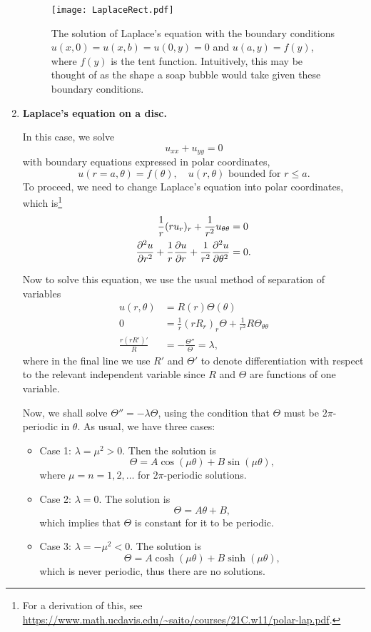 \begin{enumerate}
	\begin{figure}[!ht]
		\centering
		\texttt{[image: LaplaceRect.pdf]}
		\caption{The solution of Laplace's equation with the boundary conditions $u(x,0) = u(x,b) = u(0,y) = 0$ and $u(a,y) = f(y)$, where $f(y)$ is the tent function. Intuitively, this may be thought of as the shape a soap bubble would take given these boundary conditions.}
		\label{fig:laplacerect}
	\end{figure}
	
	\item \textbf{Laplace's equation on a disc.}
	
	In this case, we solve
	\[
		u_{xx} + u_{yy} = 0
	\]
	with boundary equations expressed in polar coordinates,
	\[
		u(r=a, \theta) = f(\theta), \quad u(r,\theta) \text{ bounded for } r \leq a.
	\]
	To proceed, we need to change Laplace's equation into polar coordinates, which is\footnote{For a derivation of this, see \url{https://www.math.ucdavis.edu/~saito/courses/21C.w11/polar-lap.pdf}.}
	\begin{align*}
		\frac{1}{r}(r u_r)_r + \frac{1}{r^2}u_{\theta\theta} &= 0 \\
		\frac{\partial^2u}{\partial r^2} + \frac{1}{r}\frac{\partial u}{\partial r} + \frac{1}{r^2}\frac{\partial^2u}{\partial\theta^2} &= 0.
	\end{align*}
	
	Now to solve this equation, we use the usual method of separation of variables
	\begin{align*}
		u(r, \theta) &= R(r)\Theta(\theta) \\
		0 &= \frac{1}{r}(r R_r)_r\Theta + \frac{1}{r^2}R \Theta_{\theta\theta} \\
		\frac{r(rR')'}{R} &= -\frac{\Theta''}{\Theta} = \lambda,
	\end{align*}
	where in the final line we use $R'$ and $\Theta'$ to denote differentiation with respect to the relevant independent variable since $R$ and $\Theta$ are functions of one variable.
	
	Now, we shall solve $\Theta'' = -\lambda\Theta$, using the condition that $\Theta$ must be $2\pi$-periodic in $\theta$. As usual, we have three cases:
	\begin{itemize}
		\item Case 1: $\lambda = \mu^2 > 0$. Then the solution is
		\[
		\Theta = A\cos(\mu\theta) + B\sin(\mu\theta),
		\]
		where $\mu = n = 1, 2, \dots$ for $2\pi$-periodic solutions.
		\item Case 2: $\lambda=0$. The solution is
		\[
		\Theta = A\theta + B,
		\]
		which implies that $\Theta$ is constant for it to be periodic.
		\item Case 3: $\lambda = -\mu^2 < 0$. The solution is
		\[
		\Theta = A\cosh(\mu\theta) + B\sinh(\mu\theta),
		\]
		which is never periodic, thus there are no solutions.
	\end{itemize}
	

\end{enumerate}
